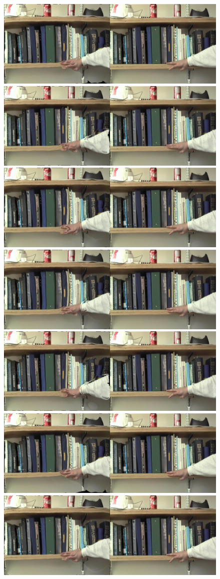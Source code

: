 \documentclass[12pt,twoside]{article}
\begin{document}
\begin{figure}[h]
\begin{center}
    \includegraphics[width=0.45\linewidth, trim= 80pt 80pt 80pt 80pt, clip]{bookshelfMag/image23.jpg} \\
    \includegraphics[width=0.45\linewidth, trim= 80pt 80pt 80pt 80pt, clip]{bookshelfMag/image9.jpg}
    \includegraphics[width=0.45\linewidth, trim= 80pt 80pt 80pt 80pt, clip]{bookshelfMag/image25.jpg} \\
    \includegraphics[width=0.45\linewidth, trim= 80pt 80pt 80pt 80pt, clip]{bookshelfMag/image11.jpg}
    \includegraphics[width=0.45\linewidth, trim= 80pt 80pt 80pt 80pt, clip]{bookshelfMag/image27.jpg} \\
    \includegraphics[width=0.45\linewidth, trim= 80pt 80pt 80pt 80pt, clip]{bookshelfMag/image13.jpg}
    \includegraphics[width=0.45\linewidth, trim= 80pt 80pt 80pt 80pt, clip]{bookshelfMag/image29.jpg} \\

\end{center}
\end{figure}
\end{document}
